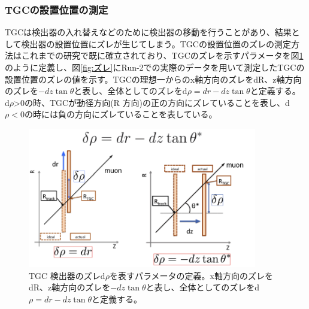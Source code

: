 \subsubsection{TGCの設置位置の測定}\label{ズレ}
TGCは検出器の入れ替えなどのために検出器の移動を行うことがあり、結果として検出器の設置位置にズレが生じてしまう。TGCの設置位置のズレの測定方法はこれまでの研究で既に確立されており、TGCのズレを示すパラメータを図\ref{fig:dr_para}のように定義し、図\ref{fig:ズレ}にRun-2での実際のデータを用いて測定したTGCの設置位置のズレの値を示す。TGCの理想一からのx軸方向のズレをdR、z軸方向のズレを$-dz\tan\theta$と表し、全体としてのズレをd$\rho = dr-dz\tan\theta$と定義する。
d$\rho$>0の時、TGCが動径方向(R 方向)の正の方向にズレていることを表し、d$\rho<0$の時には負の方向にズレていることを表している。
\begin{figure}[tb]
  \centering
  \includegraphics[clip, width=10cm]{fig/3/drho_param_position_measurement.png}
  \caption{TGC 検出器のズレd$\rho$を表すパラメータの定義。x軸方向のズレをdR、z軸方向のズレを$-dz\tan\theta$と表し、全体としてのズレをd$\rho = dr-dz\tan\theta$と定義する。}
  \label{fig:dr_para}
\end{figure}

